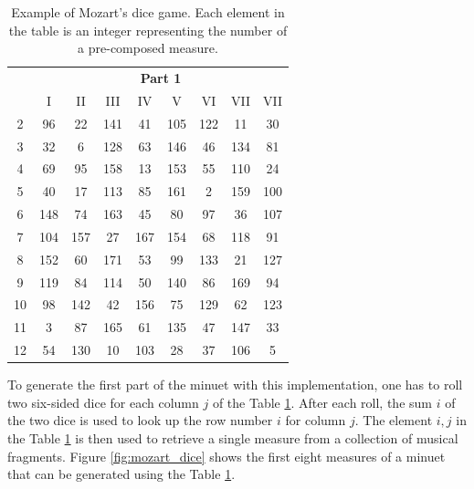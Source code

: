 \begin{table}[h]
    \centering
    \begin{tabular}{ccccccccc}
    \toprule
    & \multicolumn{8}{c}{\textbf{Part 1}} \\
    & I & II & III & IV & V & VI & VII & VII \\
    \midrule
    2  & 96  & 22  & 141 & 41  & 105 & 122 & 11  & 30  \\
    3  & 32  & 6   & 128 & 63  & 146 & 46  & 134 & 81  \\
    4  & 69  & 95  & 158 & 13  & 153 & 55  & 110 & 24  \\
    5  & 40  & 17  & 113 & 85  & 161 & 2   & 159 & 100 \\
    6  & 148 & 74  & 163 & 45  & 80  & 97  & 36  & 107 \\
    7  & 104 & 157 & 27  & 167 & 154 & 68  & 118 & 91  \\
    8  & 152 & 60  & 171 & 53  & 99  & 133 & 21  & 127 \\
    9  & 119 & 84  & 114 & 50  & 140 & 86  & 169 & 94  \\
    10 & 98  & 142 & 42  & 156 & 75  & 129 & 62  & 123 \\
    11 & 3   & 87  & 165 & 61  & 135 & 47  & 147 & 33  \\
    12 & 54  & 130 & 10  & 103 & 28  & 37  & 106 & 5   \\
    \bottomrule
    \end{tabular}
    \caption{Example of Mozart's dice game. Each element in the table is an integer
    representing the number of a pre-composed measure.}
    \label{tab:mozart_dice}
\end{table}

To generate the first part of the minuet with this implementation, one has to roll two six-sided dice
for each column $j$ of the Table \ref{tab:mozart_dice}. After each roll, the sum $i$  of the two dice is
used to look up the row number $i$ for column $j$. The element $i,j$ in the Table \ref{tab:mozart_dice}
is then used to retrieve a single measure from a collection of musical fragments.
Figure \ref{fig:mozart_dice} shows the first eight measures of a minuet that can
be generated using the Table \ref{tab:mozart_dice}.

